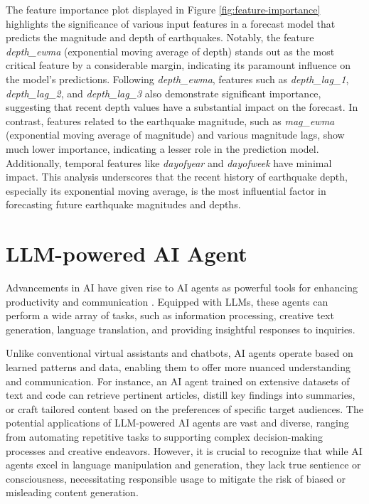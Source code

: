 The feature importance plot displayed in Figure \ref{fig:feature-importance} highlights the significance of various input features in a forecast model that predicts the magnitude and depth of earthquakes. Notably, the feature \textit{depth\_ewma} (exponential moving average of depth) stands out as the most critical feature by a considerable margin, indicating its paramount influence on the model's predictions. Following \textit{depth\_ewma}, features such as \textit{depth\_lag\_1}, \textit{depth\_lag\_2}, and \textit{depth\_lag\_3} also demonstrate significant importance, suggesting that recent depth values have a substantial impact on the forecast. In contrast, features related to the earthquake magnitude, such as \textit{mag\_ewma} (exponential moving average of magnitude) and various magnitude lags, show much lower importance, indicating a lesser role in the prediction model. Additionally, temporal features like \textit{dayofyear} and \textit{dayofweek} have minimal impact. This analysis underscores that the recent history of earthquake depth, especially its exponential moving average, is the most influential factor in forecasting future earthquake magnitudes and depths.

\section{LLM-powered AI Agent}
Advancements in AI have given rise to AI agents as powerful tools for enhancing productivity and communication \parencite{xi2023rise}. Equipped with \ac{LLM}s, these agents can perform a wide array of tasks, such as information processing, creative text generation, language translation, and providing insightful responses to inquiries.

Unlike conventional virtual assistants and chatbots, AI agents operate based on learned patterns and data, enabling them to offer more nuanced understanding and communication. For instance, an AI agent trained on extensive datasets of text and code can retrieve pertinent articles, distill key findings into summaries, or craft tailored content based on the preferences of specific target audiences. The potential applications of LLM-powered AI agents are vast and diverse, ranging from automating repetitive tasks to supporting complex decision-making processes and creative endeavors. However, it is crucial to recognize that while AI agents excel in language manipulation and generation, they lack true sentience or consciousness, necessitating responsible usage to mitigate the risk of biased or misleading content generation.

